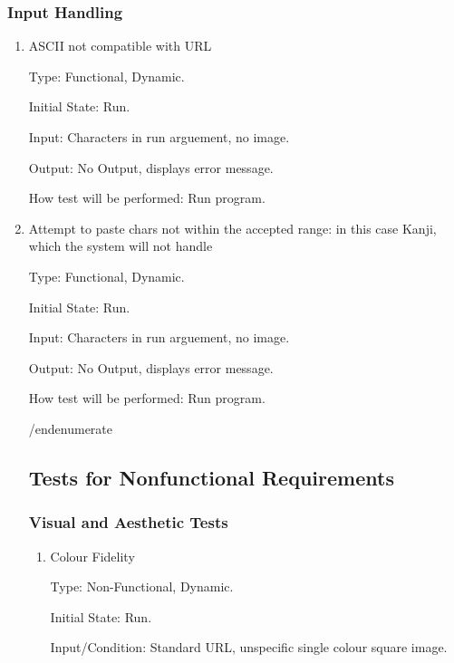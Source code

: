 \documentclass[12pt, titlepage]{article}
\begin{document}
\subsubsection{Input Handling}

\begin{enumerate}

\item{ASCII not compatible with URL\\}

Type: Functional, Dynamic.
					
Initial State: Run.
					
Input: Characters in run arguement, no image.
					
Output: No Output, displays error message.
                    
How test will be performed: Run program.

\item{Attempt to paste chars not within the accepted range: in this case Kanji, which the system will not handle\\}

Type: Functional, Dynamic.
					
Initial State: Run.
					
Input: Characters in run arguement, no image.
					
Output: No Output, displays error message.
					
How test will be performed: Run program.

/end{enumerate}

\subsection{Tests for Nonfunctional Requirements}

\subsubsection{Visual and Aesthetic Tests}

\begin{enumerate}

\item{Colour Fidelity\\}

Type: Non-Functional, Dynamic.
					
Initial State: Run.
					
Input/Condition: Standard URL, unspecific single colour square image.
					

\end{enumerate}
\end{enumerate}
\end{document}
